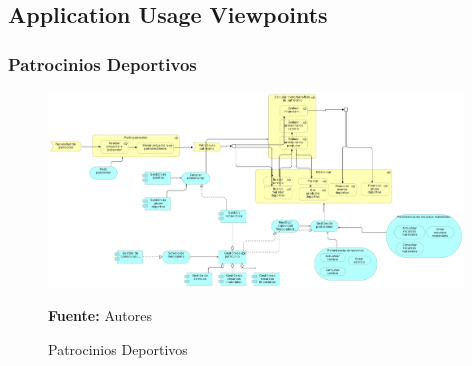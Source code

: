 \subsection{Application Usage Viewpoints}

\subsubsection{Patrocinios Deportivos}

\begin{figure}[!htb]
  \begin{center}
    \includegraphics[width=11cm]{./imagenes/application_usage/patrociniosdeportivos.png}
    \caption{Patrocinios Deportivos}
    \label{fig:au_patrocinios_deportivos}
    \textbf{Fuente:}  Autores
  \end{center}
\end{figure}

